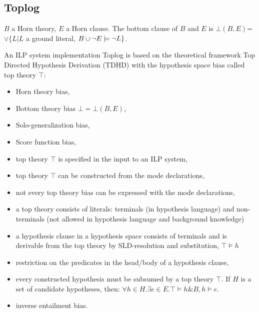 \iffalse
\subsection{Progol}
\begin{itemize}
\item Inverse Entailment,
\item a bias provided by mode declaration,
\end{itemize}
\fi

\subsection{Toplog\cite{muggleton2008}}
\begin{defn}
$B$ a Horn theory, $E$ a Horn clause. The bottom clause of $B$ and $E$ is $\bot(B,E)$=$\vee\{L | L $ a ground literal, $B \cup {\neg E} \models \neg L\}$.
\end{defn}
An ILP system implementation Toplog is based on the theoretical framework Top Directed Hypothesis Derivation (TDHD) with the hypothesis space bias called top theory $\top$:
\begin{itemize}
\item Horn theory bias,
\item Bottom theory bias $\bot = \bot(B,E)$,
\item Solo-generalization bias,
\item Score function bias,
\item top theory $\top$ is specified in the input to an ILP system,
\item top theory $\top$ can be constructed from the mode declarations,
\item not every top theory bias can be expressed with the mode declarations,
\item a top theory consists of literals: terminals (in hypothesis language) and non-terminals (not allowed in hypothesis language and background knowledge)
\item a hypothesis clause in a hypothesis space consists of terminals and is derivable from the top theory by SLD-resolution and substitution, $\top \models h$
\item restriction on the predicates in the head/body of a hypothesis clause,
\item every constructed hypothesis must be subsumed by a top theory $\top$. If $H$ is a set of candidate hypotheses, then: $\forall h \in H. \exists e \in E. \top \models h \& B, h \models e$.
\item inverse entailment bias.
\end{itemize}
